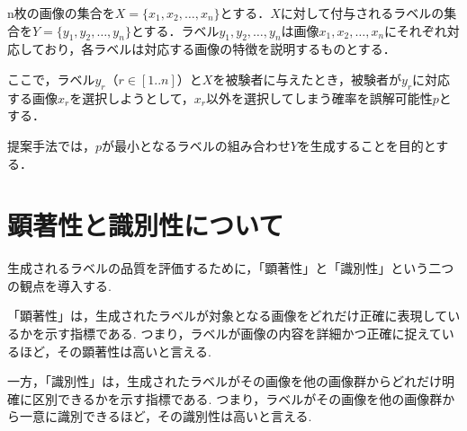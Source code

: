 \documentclass[a4paper,11pt]{jreport}
\begin{document}
n枚の画像の集合を\(X = \{x_1, x_2, \ldots, x_n\}\)とする．\(X\)に対して付与されるラベルの集合を\(Y = \{y_1, y_2, \ldots, y_n\}\)とする．ラベル\(y_1, y_2, \ldots, y_n\)は画像\(x_1, x_2, \ldots, x_n\)にそれぞれ対応しており，各ラベルは対応する画像の特徴を説明するものとする．

ここで，ラベル\(y_r\)（$r \in [1..n]$）と\(X\)を被験者に与えたとき，被験者が\(y_r\)に対応する画像\(x_r\)を選択しようとして，\(x_r\)以外を選択してしまう確率を誤解可能性\(p\)とする．

提案手法では，\(p\)が最小となるラベルの組み合わせ\(Y\)を生成することを目的とする．


\section{顕著性と識別性について}

生成されるラベルの品質を評価するために，「顕著性」と「識別性」という二つの観点を導入する.

「顕著性」は，生成されたラベルが対象となる画像をどれだけ正確に表現しているかを示す指標である.
つまり，ラベルが画像の内容を詳細かつ正確に捉えているほど，その顕著性は高いと言える.

一方，「識別性」は，生成されたラベルがその画像を他の画像群からどれだけ明確に区別できるかを示す指標である.
つまり，ラベルがその画像を他の画像群から一意に識別できるほど，その識別性は高いと言える.
\end{document}
